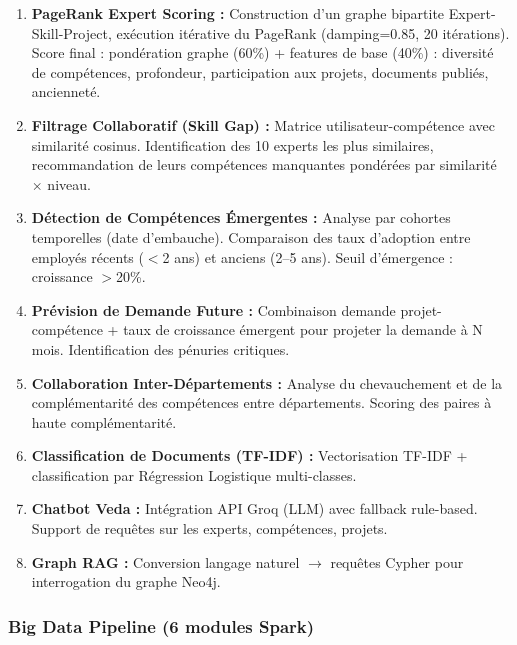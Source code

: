 \documentclass[12pt,a4paper]{article}
\begin{document}
\begin{enumerate}[leftmargin=*]
    \item \textbf{PageRank Expert Scoring :} Construction d'un graphe bipartite Expert-Skill-Project, exécution itérative du PageRank (damping=0.85, 20 itérations). Score final : pondération graphe (60\%) + features de base (40\%) : diversité de compétences, profondeur, participation aux projets, documents publiés, ancienneté.
    
    \item \textbf{Filtrage Collaboratif (Skill Gap) :} Matrice utilisateur-compétence avec similarité cosinus. Identification des 10 experts les plus similaires, recommandation de leurs compétences manquantes pondérées par similarité $\times$ niveau.
    
    \item \textbf{Détection de Compétences Émergentes :} Analyse par cohortes temporelles (date d'embauche). Comparaison des taux d'adoption entre employés récents ($<$2 ans) et anciens (2--5 ans). Seuil d'émergence : croissance $>$20\%.
    
    \item \textbf{Prévision de Demande Future :} Combinaison demande projet-compétence + taux de croissance émergent pour projeter la demande à N mois. Identification des pénuries critiques.
    
    \item \textbf{Collaboration Inter-Départements :} Analyse du chevauchement et de la complémentarité des compétences entre départements. Scoring des paires à haute complémentarité.
    
    \item \textbf{Classification de Documents (TF-IDF) :} Vectorisation TF-IDF + classification par Régression Logistique multi-classes.
    
    \item \textbf{Chatbot Veda :} Intégration API Groq (LLM) avec fallback rule-based. Support de requêtes sur les experts, compétences, projets.
    
    \item \textbf{Graph RAG :} Conversion langage naturel $\to$ requêtes Cypher pour interrogation du graphe Neo4j.
\end{enumerate}

\subsubsection{Big Data Pipeline (6 modules Spark)}
\end{document}
